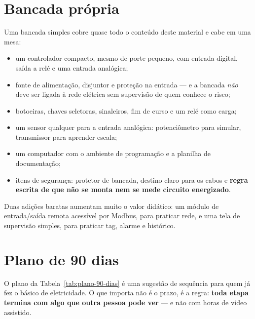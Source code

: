 
\section{Bancada própria}

Uma bancada simples cobre quase todo o conteúdo deste material e cabe em uma mesa:

\begin{itemize}
  \item um controlador compacto, mesmo de porte pequeno, com entrada digital, saída a relé e uma
        entrada analógica;
  \item fonte de alimentação, disjuntor e proteção na entrada --- e a bancada \emph{não} deve ser
        ligada à rede elétrica sem supervisão de quem conhece o risco;
  \item botoeiras, chaves seletoras, sinaleiros, fim de curso e um relé como carga;
  \item um sensor qualquer para a entrada analógica: potenciômetro para simular, transmissor para
        aprender escala;
  \item um computador com o ambiente de programação e a planilha de documentação;
  \item itens de segurança: protetor de bancada, destino claro para os cabos e \textbf{regra escrita
        de que não se monta nem se mede circuito energizado}.
\end{itemize}

Duas adições baratas aumentam muito o valor didático: um módulo de entrada/saída remota acessível por
Modbus, para praticar rede, e uma tela de supervisão simples, para praticar tag, alarme e histórico.

\section{Plano de 90 dias}

O plano da Tabela~\ref{tab:plano-90-dias} é uma sugestão de sequência para quem já fez o básico de
eletricidade. O que importa
não é o prazo, é a regra: \textbf{toda etapa termina com algo que outra pessoa pode ver} --- e não
com horas de vídeo assistido.

